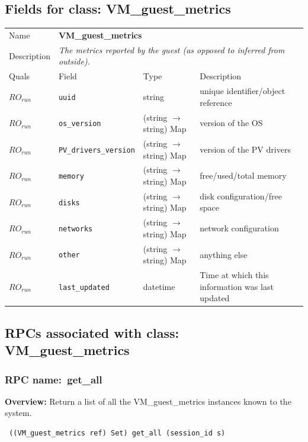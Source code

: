 \subsection{Fields for class: VM\_guest\_metrics}
\begin{longtable}{|lllp{}|}
\hline
\multicolumn{1}{|l}{Name} & \multicolumn{3}{l|}{\bf VM\_guest\_metrics} \\
\multicolumn{1}{|l}{Description} & \multicolumn{3}{l|}{\parbox{11cm}{\em
The metrics reported by the guest (as opposed to inferred from outside).}} \\
\hline
Quals & Field & Type & Description \\
\hline
$\mathit{RO}_\mathit{run}$ &  {\tt uuid} & string & unique identifier/object reference \\
$\mathit{RO}_\mathit{run}$ &  {\tt os\_version} & (string $\rightarrow$ string) Map & version of the OS \\
$\mathit{RO}_\mathit{run}$ &  {\tt PV\_drivers\_version} & (string $\rightarrow$ string) Map & version of the PV drivers \\
$\mathit{RO}_\mathit{run}$ &  {\tt memory} & (string $\rightarrow$ string) Map & free/used/total memory \\
$\mathit{RO}_\mathit{run}$ &  {\tt disks} & (string $\rightarrow$ string) Map & disk configuration/free space \\
$\mathit{RO}_\mathit{run}$ &  {\tt networks} & (string $\rightarrow$ string) Map & network configuration \\
$\mathit{RO}_\mathit{run}$ &  {\tt other} & (string $\rightarrow$ string) Map & anything else \\
$\mathit{RO}_\mathit{run}$ &  {\tt last\_updated} & datetime & Time at which this information was last updated \\
\hline
\end{longtable}
\subsection{RPCs associated with class: VM\_guest\_metrics}
\subsubsection{RPC name:~get\_all}

{\bf Overview:} 
Return a list of all the VM\_guest\_metrics instances known to the system.

\begin{verbatim} ((VM_guest_metrics ref) Set) get_all (session_id s)\end{verbatim}


